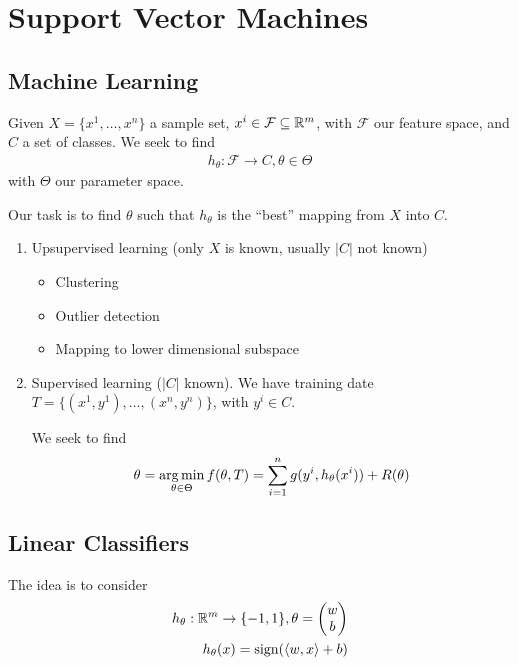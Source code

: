 \chapter{Support Vector Machines}
\label{cha:supp-vect-mach}

\section{Machine Learning}
\label{sec:machine-learning}

Given $X = \{ x^{1}, \dots, x^{n} \}$ a sample set, $x^{i} \in
\mathcal{F} \subseteq \mathbb{R}^{m}$, with $\mathcal{F}$ our feature space,
and $C$ a set of classes.  We seek to find
\begin{align}
  \label{eq:89}
  h_{\theta}: \mathcal{F} \rightarrow C, \theta \in \Theta
\end{align} with $\Theta$ our parameter space.

Our task is to find $\theta$ such that $h_{\theta}$ is the ``best''
mapping from $X$ into $C$.

\begin{enumerate}
\item Upsupervised learning (only $X$ is known, usually $|C|$ not known)
  \begin{itemize}
  \item Clustering
  \item Outlier detection
  \item Mapping to lower dimensional subspace
  \end{itemize}
\item Supervised learning ($|C|$ known).  We have training date $T =
  \{ (x^{1}, y^{1}), \dots, (x^{n}, y^{n}) \}$, with $y^{i} \in C$.

  We seek to find
  \begin{align}
    \label{eq:90}
    \theta = \operatorname*{arg\,min}_{\theta \in \Theta} f(\theta, T) = \sum_{i=1}^{n}
    g(y^{i}, h_{\theta}(x^{i})) + R(\theta)
  \end{align}
\end{enumerate}

\section{Linear Classifiers}
\label{sec:linear-classifiers}

The idea is to consider
\begin{align}
  \label{eq:91}
  h_{\theta}: \R^{m} \rightarrow \{ -1, 1 \}, \theta =
  \begin{pmatrix}
    w \\
    b
  \end{pmatrix} \\
  h_{\theta}(x) = \sign (\IP{w, x} + b)
\end{align}

